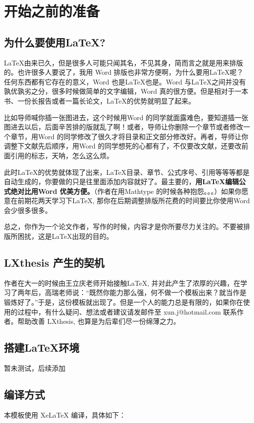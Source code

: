 \chapter{开始之前的准备}
\section{为什么要使用\LaTeX?}
\LaTeX 由来已久，但是很多人可能只闻其名，不见其身，简而言之就是用来排版的。也许很多人要说了，我用 Word 排版也非常方便啊，为什么要用\LaTeX 呢？任何东西都有它存在的意义，Word 也是\LaTeX 也是。Word 与\LaTeX 之间并没有孰优孰劣之分，很多时候做简单的文字编辑，Word 真的很方便。但是相对于一本书、一份长报告或者一篇长论文，\LaTeX 的优势就明显了起来。

比如导师喊你插一张图进去，这个时候用Word 的同学就面露难色，要知道插一张图进去以后，后面辛苦排的版就乱了啊！或者，导师让你删除一个章节或者修改一个章节，用Word 的同学修改了很久才将目录和正文部分修改好。再者，导师让你调整下文献先后顺序，用Word 的同学想死的心都有了，不仅要改文献，还要改前面引用的标志，天呐，怎么这么烦。

此时\LaTeX 的优势就体现了出来，\LaTeX 目录、章节、公式序号、引用等等等都是自动生成的，你要做的只是往里面添加内容就好了。最主要的，\textbf{用\LaTeX 编辑公式绝对比用Word 优美方便。}（作者在用Mathtype 的时候各种抱怨。。。）如果你愿意在前期花两天学习下\LaTeX, 那你在后期调整排版所花费的时间要比你使用Word 会少很多很多。

总之，你作为一个论文作者，写作的时候，内容才是你所要尽力关注的。不要被排版所困扰，这是\LaTeX 出现的目的。

\section{LXthesis 产生的契机}
作者在大一的时候由王立庆老师开始接触\LaTeX, 并对此产生了浓厚的兴趣，在学习了两年后，高瑞老师说：“既然你能力那么强，何不做一个模板出来？就当作是锻炼好了。”于是，这份模板就出现了。但是一个人的能力总是有限的，如果你在使用的过程中，有什么疑问、想法或者建议请发邮件至 {\sf xun.j@hotmail.com} 联系作者。帮助改善 LXthesis, 也算是为后辈们尽一份绵薄之力。

\section{搭建\LaTeX 环境}
暂未测试，后续添加

\section{编译方式}
本模板使用 XeLaTeX 编译，具体如下：

